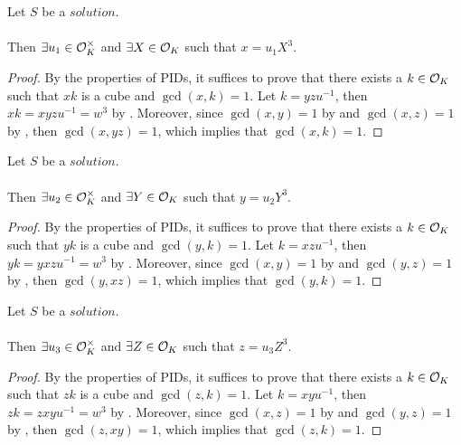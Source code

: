 \begin{lemma}
    \label{lmm:x_eq_unit_mul_cube}
    \leanok
    Let $S$ be a $solution$.\\\\
    Then $\exists u_1 \in \mathcal{O}^\times_K$ and $\exists X \in \mathcal{O}_K$
    such that $x = u_1 X^3$.
\end{lemma}
\begin{proof}
    \leanok
    By the properties of PIDs, it suffices to prove that there exists a $k\in \mathcal{O}_K$ such that
    $xk$ is a cube and $\gcd(x,k)=1$.
    Let $k = yzu^{-1}$, then $xk = x y z u^{-1} = w^3$ by .
    Moreover, since $\gcd(x,y)=1$ by  and $\gcd(x,z)=1$ by ,
    then $\gcd(x,yz)=1$, which implies that $\gcd(x,k)=1$.
\end{proof}

\begin{lemma}
    \label{lmm:y_eq_unit_mul_cube}
    \leanok
    Let $S$ be a $solution$.\\\\
    Then $\exists u_2 \in \mathcal{O}^\times_K$ and $\exists Y \in \mathcal{O}_K$
    such that $y = u_2 Y^3$.
\end{lemma}
\begin{proof}
    \leanok
    By the properties of PIDs, it suffices to prove that there exists a $k\in \mathcal{O}_K$ such that
    $yk$ is a cube and $\gcd(y,k)=1$.
    Let $k = xzu^{-1}$, then $yk = y x z u^{-1} = w^3$ by .
    Moreover, since $\gcd(x,y)=1$ by  and $\gcd(y,z)=1$ by ,
    then $\gcd(y,xz)=1$, which implies that $\gcd(y,k)=1$.
\end{proof}

\begin{lemma}
    \label{lmm:z_eq_unit_mul_cube}
    \leanok
    Let $S$ be a $solution$.\\\\
    Then $\exists u_3 \in \mathcal{O}^\times_K$ and $\exists Z \in \mathcal{O}_K$
    such that $z = u_3  Z^3$.
\end{lemma}
\begin{proof}
    \leanok
    By the properties of PIDs, it suffices to prove that there exists a $k\in \mathcal{O}_K$ such that
    $zk$ is a cube and $\gcd(z,k)=1$.
    Let $k = xyu^{-1}$, then $zk = z x y u^{-1} = w^3$ by .
    Moreover, since $\gcd(x,z)=1$ by  and $\gcd(y,z)=1$ by ,
    then $\gcd(z,xy)=1$, which implies that $\gcd(z,k)=1$.
\end{proof}

